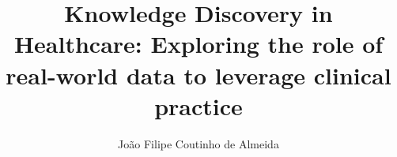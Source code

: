\documentclass[11pt,a4paper,twoside,openright]{report}
\begin{document}



\onehalfspacing
\title{Knowledge Discovery in Healthcare: Exploring the role of real-world data to leverage clinical practice}

\author{João Filipe Coutinho de Almeida}








\end{document}
